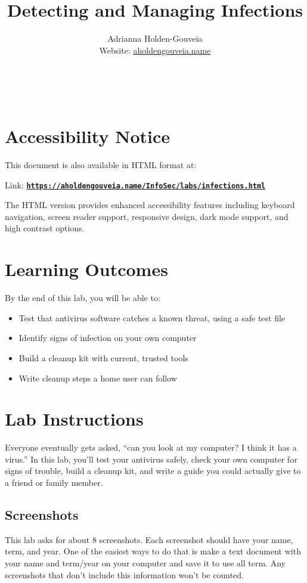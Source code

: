 \documentclass[12pt]{article}
\title{Detecting and Managing Infections}
\author{
        Adrianna Holden-Gouveia \\
        Website: \href{https://aholdengouveia.name}{aholdengouveia.name}\\ 
        \date{\vspace{-5ex}}
        \faGithub {: aholdengouveia} \\
        \faTwitter {: aholdengouveia} \\
        }
\begin{document}
\maketitle

\section*{Accessibility Notice}
This document is also available in HTML format at:

Link: \href{https://aholdengouveia.name/InfoSec/labs/infections.html}{\textbf{\nolinkurl{https://aholdengouveia.name/InfoSec/labs/infections.html}}}

The HTML version provides enhanced accessibility features including keyboard navigation, screen reader support, responsive design, dark mode support, and high contrast options.

\section*{Learning Outcomes}
By the end of this lab, you will be able to:
\begin{itemize}
    \item Test that antivirus software catches a known threat, using a safe test file
    \item Identify signs of infection on your own computer
    \item Build a cleanup kit with current, trusted tools
    \item Write cleanup steps a home user can follow
\end{itemize}

\section*{Lab Instructions}
Everyone eventually gets asked, ``can you look at my computer? I think it has a virus.'' In this lab, you'll test your antivirus safely, check your own computer for signs of trouble, build a cleanup kit, and write a guide you could actually give to a friend or family member.

\subsection*{Screenshots}
This lab asks for about 8 screenshots. Each screenshot should have your name, term, and year.  One of the easiest ways to do that is make a text document with your name and term/year on your computer and save it to use all term. Any screenshots that don't include this information won't be counted.
\end{document}

